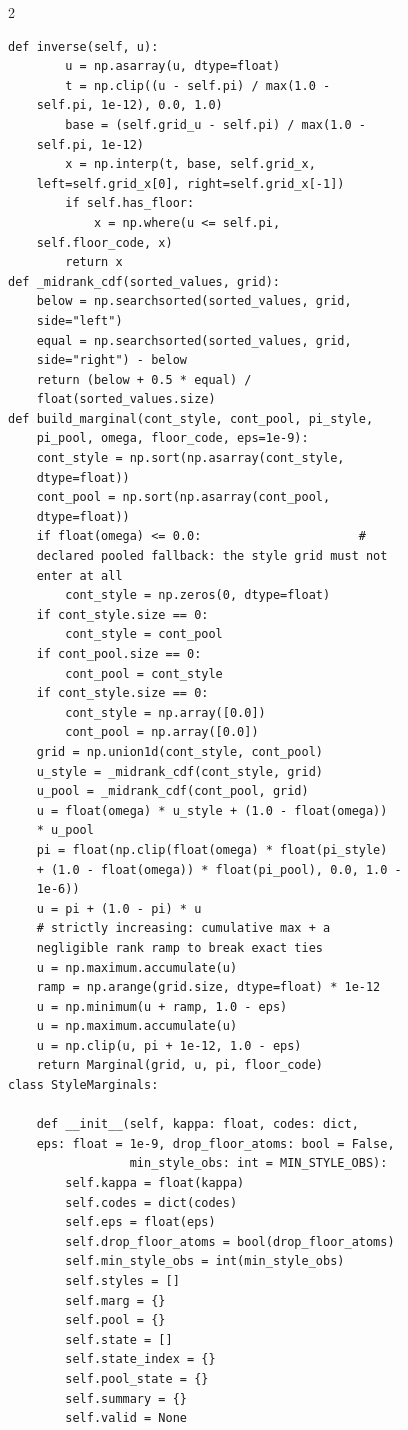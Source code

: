 \begin{multicols}{2}
\begin{Verbatim}[fontsize=\scriptsize]
    def inverse(self, u):
        u = np.asarray(u, dtype=float)
        t = np.clip((u - self.pi) / max(1.0 -
    self.pi, 1e-12), 0.0, 1.0)
        base = (self.grid_u - self.pi) / max(1.0 -
    self.pi, 1e-12)
        x = np.interp(t, base, self.grid_x,
    left=self.grid_x[0], right=self.grid_x[-1])
        if self.has_floor:
            x = np.where(u <= self.pi,
    self.floor_code, x)
        return x
def _midrank_cdf(sorted_values, grid):
    below = np.searchsorted(sorted_values, grid,
    side="left")
    equal = np.searchsorted(sorted_values, grid,
    side="right") - below
    return (below + 0.5 * equal) /
    float(sorted_values.size)
def build_marginal(cont_style, cont_pool, pi_style,
    pi_pool, omega, floor_code, eps=1e-9):
    cont_style = np.sort(np.asarray(cont_style,
    dtype=float))
    cont_pool = np.sort(np.asarray(cont_pool,
    dtype=float))
    if float(omega) <= 0.0:                      #
    declared pooled fallback: the style grid must not
    enter at all
        cont_style = np.zeros(0, dtype=float)
    if cont_style.size == 0:
        cont_style = cont_pool
    if cont_pool.size == 0:
        cont_pool = cont_style
    if cont_style.size == 0:
        cont_style = np.array([0.0])
        cont_pool = np.array([0.0])
    grid = np.union1d(cont_style, cont_pool)
    u_style = _midrank_cdf(cont_style, grid)
    u_pool = _midrank_cdf(cont_pool, grid)
    u = float(omega) * u_style + (1.0 - float(omega))
    * u_pool
    pi = float(np.clip(float(omega) * float(pi_style)
    + (1.0 - float(omega)) * float(pi_pool), 0.0, 1.0 -
    1e-6))
    u = pi + (1.0 - pi) * u
    # strictly increasing: cumulative max + a
    negligible rank ramp to break exact ties
    u = np.maximum.accumulate(u)
    ramp = np.arange(grid.size, dtype=float) * 1e-12
    u = np.minimum(u + ramp, 1.0 - eps)
    u = np.maximum.accumulate(u)
    u = np.clip(u, pi + 1e-12, 1.0 - eps)
    return Marginal(grid, u, pi, floor_code)
class StyleMarginals:

    def __init__(self, kappa: float, codes: dict,
    eps: float = 1e-9, drop_floor_atoms: bool = False,
                 min_style_obs: int = MIN_STYLE_OBS):
        self.kappa = float(kappa)
        self.codes = dict(codes)
        self.eps = float(eps)
        self.drop_floor_atoms = bool(drop_floor_atoms)
        self.min_style_obs = int(min_style_obs)
        self.styles = []
        self.marg = {}
        self.pool = {}
        self.state = []
        self.state_index = {}
        self.pool_state = {}
        self.summary = {}
        self.valid = None


\end{Verbatim}
\end{multicols}
